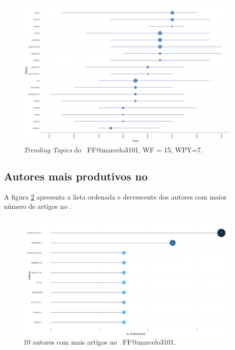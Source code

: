 \begin{figure}
    \centering
    \includegraphics[width=1\textwidth]{exploratory-data-analysis/marcelo3101/PesqBibliogr/ForestFire/WoS-20221204/assets/TrendTopicsFFmarcelo3101.png}
    \caption{\textit{Trending Topics} do \dataset\ FF@marcelo3101, WF = 15, WPY=7.}
    \label{fig:FF@marcelo3101:TrendTopics}
\end{figure}

\subsection{Autores mais produtivos no \dataset}

A figura \ref{fig:FF@marcelo3101:Author:Production} apresenta a lista ordenada e decrescente dos autores com maior número de artigos no \dataset.

\begin{figure}
    \centering
    \includegraphics[width=1\textwidth]{exploratory-data-analysis/marcelo3101/PesqBibliogr/ForestFire/WoS-20221204/assets/mostRelevantAuthorFFmarcelo3101.png}
    \caption{10 autores com mais artigos no \dataset\ FF@marcelo3101.}
    \label{fig:FF@marcelo3101:Author:Production}
\end{figure}

